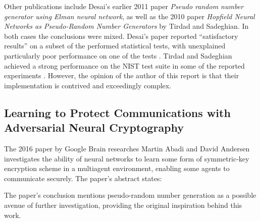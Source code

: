 \documentclass[12pt, titlepage]{report}
\theoremstyle{definition}
\begin{document}
Other publications include Desai's earlier 2011 paper \textit{Pseudo random number generator using Elman neural network}, as well as the 2010 paper \textit{Hopfield Neural Networks as Pseudo-Random Number Generators} by Tirdad and Sadeghian. In both cases the conclusions were mixed. Desai's paper reported ``satisfactory results'' on a subset of the performed statistical tests, with unexplained particularly poor performance on one of the tests \cite{desai2011pseudo}. Tirdad and Sadeghian achieved a strong performance on the NIST test suite in some of the reported experiments \cite{tirdad2010hopfield}. However, the opinion of the author of this report is that their implementation is contrived and exceedingly complex. 


\subsection{Learning to Protect Communications with Adversarial Neural Cryptography}
The 2016 paper by Google Brain researches Martin Abadi and David Andersen investigates the ability of neural networks to learn some form of symmetric-key encryption scheme in a multiagent environment, enabling some agents to communicate securely. The paper's abstract states:

 \cite{abadi2016learning}

The paper's conclusion mentions pseudo-random number generation as a possible avenue of further investigation, providing the original inspiration behind this work.





\end{document}
